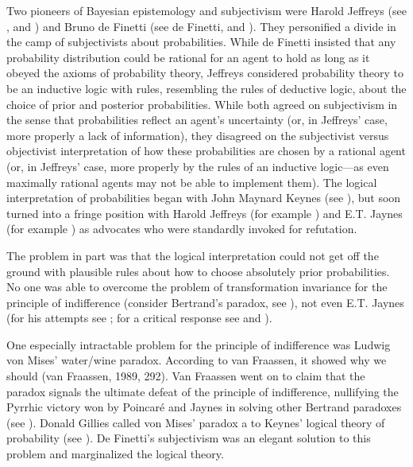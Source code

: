 \documentclass[11pt]{article}
\begin{document}
Two pioneers of Bayesian epistemology and subjectivism were Harold
Jeffreys (see , and )
and Bruno de Finetti (see de Finetti,  and
). They personified a divide in the camp of
subjectivists about probabilities. While de Finetti insisted that any
probability distribution could be rational for an agent to hold as
long as it obeyed the axioms of probability theory, Jeffreys
considered probability theory to be an inductive logic with rules,
resembling the rules of deductive logic, about the choice of prior and
posterior probabilities. While both agreed on subjectivism in the
sense that probabilities reflect an agent's uncertainty (or, in
Jeffreys' case, more properly a lack of information), they disagreed
on the subjectivist versus objectivist interpretation of how these
probabilities are chosen by a rational agent (or, in Jeffreys' case,
more properly by the rules of an inductive logic---as even maximally
rational agents may not be able to implement them). The logical
interpretation of probabilities began with John Maynard Keynes (see
), but soon turned into a fringe position with
Harold Jeffreys (for example ) and E.T. Jaynes
(for example ) as advocates who were
standardly invoked for refutation.

The problem in part was that the logical interpretation could not get
off the ground with plausible rules about how to choose absolutely prior
probabilities. No one was able to overcome the problem of
transformation invariance for the principle of indifference (consider
Bertrand's paradox, see ), not even E.T. Jaynes
(for his attempts see ; for a critical response
see  and ).

One especially intractable problem for the principle of indifference
was Ludwig von Mises' water/wine paradox. According to van Fraassen,
it showed why we should  (van Fraassen, 1989,
292). Van Fraassen went on to claim
that the paradox signals the ultimate defeat of the principle of
indifference, nullifying the Pyrrhic victory won by Poincar{\'e} and
Jaynes in solving other Bertrand paradoxes (see
). Donald Gillies called von Mises' paradox
a  to Keynes' logical
theory of probability (see ). De Finetti's
subjectivism was an elegant solution to this problem and marginalized
the logical theory.
\end{document}
